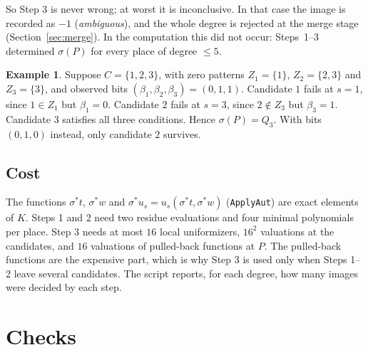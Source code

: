 \documentclass[11pt]{amsart}
\theoremstyle{definition}
\newtheorem{example}[theorem]{Example}
\theoremstyle{remark}
\newcommand{\code}[1]{\texttt{#1}}
\begin{document}
So Step 3 is never wrong; at worst it is inconclusive. In that case the image is recorded as $-1$ (\emph{ambiguous}), and the whole degree is rejected at the merge stage (Section~\ref{sec:merge}). In the computation this did not occur: Steps~1--3 determined $\sigma(P)$ for every place of degree $\le5$.

\begin{example}
Suppose $C=\{1,2,3\}$, with zero patterns $Z_1=\{1\}$, $Z_2=\{2,3\}$ and $Z_3=\{3\}$, and observed bits $(\beta_1,\beta_2,\beta_3)=(0,1,1)$. Candidate $1$ fails at $s=1$, since $1\in Z_1$ but $\beta_1=0$. Candidate $2$ fails at $s=3$, since $2\notin Z_3$ but $\beta_3=1$. Candidate $3$ satisfies all three conditions. Hence $\sigma(P)=Q_3$. With bits $(0,1,0)$ instead, only candidate $2$ survives.
\end{example}

\subsection{Cost}
The functions $\sigma^*t$, $\sigma^*w$ and $\sigma^*u_s=u_s(\sigma^*t,\sigma^*w)$ (\code{ApplyAut}) are exact elements of $K$. Steps 1 and 2 need two residue evaluations and four minimal polynomials per place. Step 3 needs at most $16$ local uniformizers, $16^2$ valuations at the candidates, and $16$ valuations of pulled-back functions at $P$. The pulled-back functions are the expensive part, which is why Step 3 is used only when Steps 1--2 leave several candidates. The script reports, for each degree, how many images were decided by each step.

\section{Checks}\label{sec:checks}
\end{document}
